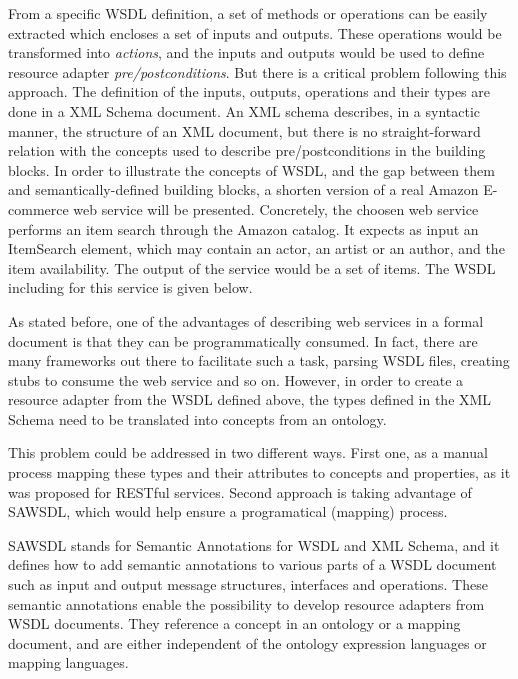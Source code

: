 \documentclass{fast_latex}
\begin{document}
From a specific WSDL definition, a set of methods or operations can be easily extracted which encloses a set of inputs and outputs. These operations would be transformed into \emph{actions}, and the inputs and outputs would be used to define resource adapter \emph{pre/postconditions}. But there is a critical problem following this approach. The definition of the inputs, outputs, operations and their types are done in a XML Schema document. An XML schema describes, in a syntactic manner, the structure of an XML document, but there is no straight-forward relation with the concepts used to describe pre/postconditions in the building blocks. In order to illustrate the concepts of WSDL, and the gap between them and semantically-defined building blocks, a shorten version of a real Amazon E-commerce web service will be presented. Concretely, the choosen web service performs an item search through the Amazon catalog. It expects as input an ItemSearch element, which may contain an actor, an artist or an author, and the item availability. The output of the service would be a set of items. The WSDL including for this service is given below.

\singlespacing
\begin{small}

\end{small}
\doublespacing

As stated before, one of the advantages of describing web services in a formal document is that they can be programmatically consumed. In fact, there are many frameworks out there to facilitate such a task, parsing WSDL files, creating stubs to consume the web service and so on. However, in order to create a resource adapter from the WSDL defined above, the types defined in the XML Schema need to be translated into concepts from an ontology.

This problem could be addressed in two different ways. First one, as a manual process mapping these types and their attributes to concepts and properties, as it was proposed for RESTful services. Second approach is taking advantage of SAWSDL, which would help ensure a programatical (mapping) process.

SAWSDL \cite{sawsdl} stands for Semantic Annotations for WSDL and XML Schema, and it defines how to add semantic annotations to various parts of a WSDL document such as input and output message structures, interfaces and operations. These semantic annotations enable the possibility to develop resource adapters from WSDL documents. They reference a concept in an ontology or a mapping document, and are either independent of the ontology expression languages or mapping languages.
\end{document}
